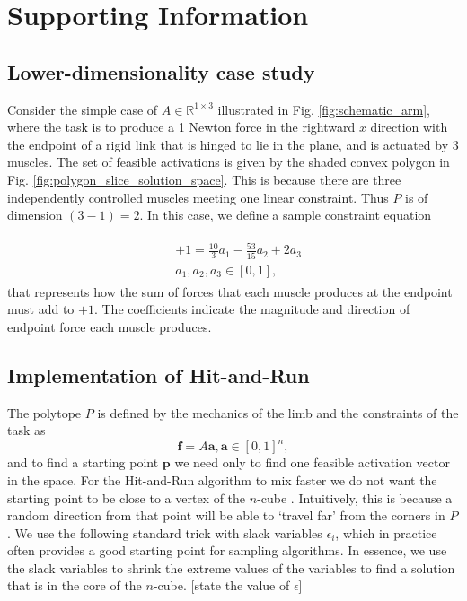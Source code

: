 \documentclass[10pt,letterpaper]{article}
\begin{document}
\section*{Supporting Information}

\subsection*{Lower-dimensionality case study}


Consider the simple case of $A  \in \mathbb{R}^{1 \times 3}$  illustrated in Fig. \ref{fig:schematic_arm}, where the task is to produce a 1 Newton force in the rightward $x$ direction with the endpoint of a rigid link that is hinged to lie in the plane, and is actuated by 3 muscles.
The set of feasible activations is given by the shaded convex polygon in Fig. \ref{fig:polygon_slice_solution_space}. This is because there are three independently controlled muscles meeting one linear   constraint. Thus $P$ is of dimension $(3-1) = 2$. In this case, we define a sample constraint equation 

\begin{align}
\label{eq:constraint}
\begin{split}
	&+1 = \frac{10}{3}a_1 - \frac{53}{15}a_2 + 2a_3 \\
&a_1, a_2, a_3 \in [0,1],
\end{split}
\end{align}
that represents how the sum of forces that each muscle produces at the endpoint must add to $+1$. The coefficients indicate the magnitude and direction of endpoint force each muscle produces.




\subsection*{Implementation of Hit-and-Run}
The polytope $P$ is defined by the mechanics of the limb and the constraints of the task as
\[\textbf{f} = A\textbf{a}, \textbf{a} \in [0,1]^n,\]
and to find a starting point $\textbf{p}$ we  need only to find one feasible activation vector in the space.
For the Hit-and-Run algorithm to mix faster we do not want the starting point to be close to a vertex of the $n$-cube \cite{Lovasz}. Intuitively, this is because a random direction from that point will be able to `travel far' from the corners in $P$.
We use the following standard trick with slack variables $\epsilon_i$, which in practice often provides a good starting point for sampling algorithms. In essence, we use the slack variables to shrink the extreme values of the variables to find a solution that is in the core of the $n$-cube. [state the value of $\epsilon$]
\end{document}
